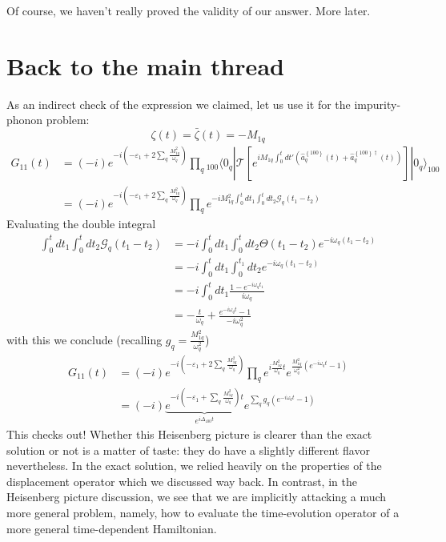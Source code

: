Of course, we haven't really proved the validity of our answer. More later.

\section{Back to the main thread}

As an indirect check of the expression we claimed, let us use it for the impurity-phonon problem:
\[ \zeta \left( t \right) =\bar{\zeta}\left( t \right) =-M_{1q}\]
\begin{align*}
    G_{11}\left( t \right) &=\left( -i \right) e^{-i\left( -\varepsilon _1+2\sum_q{\frac{M_{1q}^{2}}{\omega _q}} \right)}\prod_q{_{100}\langle 0_q|\mathcal{T} \left[ e^{iM_{1q}\int_0^t{dt'\left( \hat{a}_{q}^{\left\{ 100 \right\}}\left( t \right) +\hat{a}_{q}^{\left\{ 100 \right\} \dagger}\left( t \right) \right)}} \right] |0_q\rangle _{100}}\\
    &=\left( -i \right) e^{-i\left( -\varepsilon _1+2\sum_q{\frac{M_{1q}^{2}}{\omega _q}} \right)}\prod_q{e^{-iM_{1q}^{2}\int_0^t{dt_1\int_0^t{dt_2\mathscr{G} _q\left( t_1-t_2 \right)}}}}
\end{align*}
Evaluating the double integral
\begin{align*}
    \int_0^t{dt_1\int_0^t{dt_2\mathscr{G} _q\left( t_1-t_2 \right)}}&=-i\int_0^t{dt_1\int_0^t{dt_2\Theta \left( t_1-t_2 \right) e^{-i\omega _q\left( t_1-t_2 \right)}}}\\
    &=-i\int_0^t{dt_1\int_0^{t_1}{dt_2e^{-i\omega _q\left( t_1-t_2 \right)}}}\\
    &=-i\int_0^t{dt_1\frac{1-e^{-i\omega _qt_1}}{i\omega _q}}\\
    &=-\frac{t}{\omega _q}+\frac{e^{-i\omega _qt}-1}{-i\omega _{q}^{2}}
\end{align*}
with this we conclude (recalling $g_q=\frac{M_{1q}^{2}}{\omega _{q}^{2}}$)
\begin{align*}
    G_{11}\left( t \right) &=\left( -i \right) e^{-i\left( -\varepsilon _1+2\sum_q{\frac{M_{1q}^{2}}{\omega _q}} \right)}\prod_q{e^{i\frac{M_{1q}^{2}}{\omega _q}t}e^{\frac{M_{1q}^{2}}{\omega _{q}^{2}}\left( e^{-i\omega _qt}-1 \right)}}\\
    &=\left( -i \right) \underset{e^{i\Delta _{100}t}}{\underbrace{e^{-i\left( -\varepsilon _1+\sum_q{\frac{M_{1q}^{2}}{\omega _q}} \right) t}}}e^{\sum_q{g_q\left( e^{-i\omega _qt}-1 \right)}}
\end{align*}
This checks out! Whether this Heisenberg picture is clearer than the exact solution or not is a matter of taste: they do have a slightly different flavor nevertheless. In the exact solution, we relied heavily on the properties of the displacement operator which we discussed way back. In contrast, in the Heisenberg picture discussion, we see that we are implicitly attacking a much more general problem, namely, how to evaluate the time-evolution operator of a more general time-dependent Hamiltonian.
